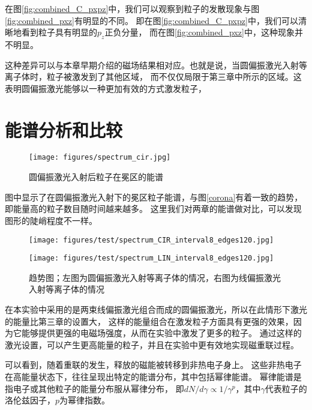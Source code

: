 在图\ref{fig:combined_C_pxpz}中，我们可以观察到粒子的发散现象与图\ref{fig:combined_pxz}有明显的不同。
即在图\ref{fig:combined_C_pxpz}中，我们可以清晰地看到粒子具有明显的$p_z$正负分量，
而在图\ref{fig:combined_pxz}中，这种现象并不明显。

这种差异可以与本章早期介绍的磁场结果相对应。也就是说，当圆偏振激光入射等离子体时，粒子被激发到了其他区域，
而不仅仅局限于第三章中所示的区域。这表明圆偏振激光能够以一种更加有效的方式激发粒子，

\section[\textnormal{能谱分析和比较}]{\textbf{能谱分析和比较}}
\begin{figure}[H]
    \centering
    \texttt{[image: figures/spectrum\_cir.jpg]}
    \caption{圆偏振激光入射后粒子在冕区的能谱}
    \label{corona1}
\end{figure}

图中显示了在圆偏振激光入射下的冕区粒子能谱，与图\ref{corona}有着一致的趋势，即能量高的粒子数目随时间越来越多。
这里我们对两章的能谱做对比，可以发现图形的陡峭程度不一样。
\begin{figure}[H]
    \begin{minipage}[t]{0.5\linewidth}
        \centering
        \texttt{[image: figures/test/spectrum\_CIR\_interval8\_edges120.jpg]}
        \label{kinetic_energy_spectrum_with_p:a}
    \end{minipage}%
    \begin{minipage}[t]{0.5\linewidth}
        \centering
        \texttt{[image: figures/test/spectrum\_LIN\_interval8\_edges120.jpg]}
        \label{kinetic_energy_spectrum_with_p:b}
    \end{minipage}
    \caption{趋势图；左图为圆偏振激光入射等离子体的情况，右图为线偏振激光入射等离子体的情况}
    \label{fig:kinetic_energy_spectrum}

\end{figure}

在本实验中采用的是两束线偏振激光组合而成的圆偏振激光，所以在此情形下激光的能量比第三章的设置大，
这样的能量组合在激发粒子方面具有更强的效果，因为它能够提供更强的电磁场强度，从而在实验中激发了更多的粒子。
通过这样的激光设置，可以产生更高能量的粒子，并且在实验中更有效地实现磁重联过程。

可以看到，随着重联的发生，释放的磁能被转移到非热电子身上\cite{Yi_2018}。
这些非热电子在高能量状态下，往往呈现出特定的能谱分布\cite{TangNov2020}，其中包括幂律能谱。
幂律能谱是指电子或其他粒子的能量分布服从幂律分布\cite{gaisser2016cosmic}，
即$dN/d\gamma \propto 1/\gamma^p$，其中$\gamma$代表粒子的洛伦兹因子，$p$为幂律指数。

